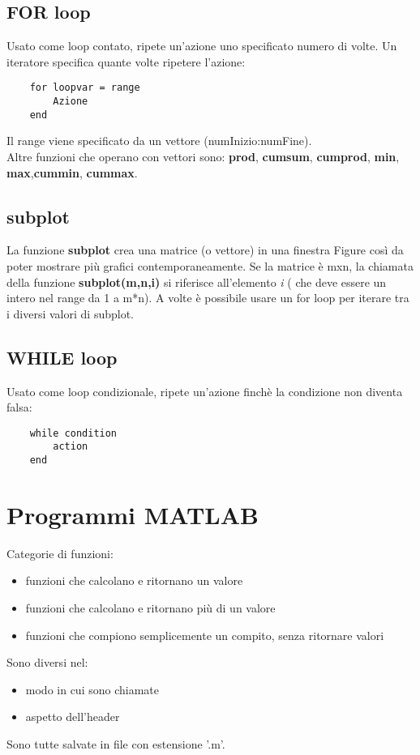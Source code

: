 \documentclass[a4paper, 10pt]{article}
\begin{document}
\subsection{FOR loop}
Usato come loop contato, ripete un'azione uno specificato numero di volte. Un iteratore specifica quante volte ripetere l'azione:
\begin{lstlisting}
	for loopvar = range
		Azione
	end
\end{lstlisting}
Il range viene specificato da un vettore (numInizio:numFine).\\
Altre funzioni che operano con vettori sono: \textbf{prod},
\textbf{cumsum}, \textbf{cumprod}, \textbf{min}, \textbf{max},\textbf{cummin}, \textbf{cummax}.

\subsection{subplot}
La funzione \textbf{subplot} crea una matrice (o vettore) in una finestra Figure così da poter mostrare più grafici contemporaneamente. Se la matrice è mxn, la chiamata della funzione \textbf{subplot(m,n,i)} si riferisce all'elemento \textit{i} ( che deve essere un intero nel range da 1 a m*n).
A volte è possibile usare un for loop per iterare tra i diversi valori di subplot.

\subsection{WHILE loop}
Usato come loop condizionale, ripete un'azione finchè la condizione non diventa falsa:

\begin{lstlisting}
	while condition
		action
	end
\end{lstlisting}
\newpage

\section{Programmi MATLAB}
Categorie di funzioni:
\begin{itemize}
\item funzioni che calcolano e ritornano un valore
\item funzioni che calcolano e ritornano più di un valore
\item funzioni che compiono semplicemente un compito, senza ritornare valori
\end{itemize}
Sono diversi nel:
\begin{itemize}
\item modo in cui sono chiamate
\item aspetto dell'header
\end{itemize}
Sono tutte salvate in file con estensione '.m'.
\end{document}
